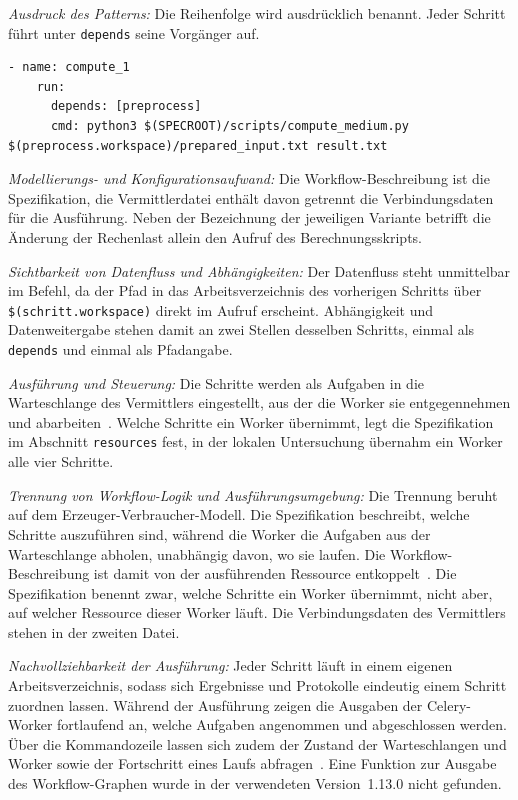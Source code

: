 \emph{Ausdruck des Patterns:} Die Reihenfolge wird ausdrücklich
benannt. Jeder Schritt führt unter \texttt{depends} seine Vorgänger
auf.

\begin{lstlisting}[caption={Abhängigkeit und Datenweitergabe eines Schritts (Merlin, Pipeline)},label={lst:pipe:me}]
  - name: compute_1
    run:
      depends: [preprocess]
      cmd: python3 $(SPECROOT)/scripts/compute_medium.py $(preprocess.workspace)/prepared_input.txt result.txt
\end{lstlisting}

\emph{Modellierungs- und Konfigurationsaufwand:} Die
Workflow-Beschreibung ist die Spezifikation, die Vermittlerdatei
enthält davon getrennt die Verbindungsdaten für die Ausführung. Neben der Bezeichnung der jeweiligen Variante betrifft die Änderung
der Rechenlast allein den Aufruf des Berechnungsskripts.

\emph{Sichtbarkeit von Datenfluss und Abhängigkeiten:} Der Datenfluss
steht unmittelbar im Befehl, da der Pfad in das Arbeitsverzeichnis
des vorherigen Schritts über \texttt{\$(schritt.workspace)} direkt im
Aufruf erscheint. Abhängigkeit und Datenweitergabe stehen damit an
zwei Stellen desselben Schritts, einmal als \texttt{depends} und
einmal als Pfadangabe.

\emph{Ausführung und Steuerung:} Die Schritte werden als Aufgaben in die Warteschlange des Vermittlers eingestellt, aus der die Worker
sie entgegennehmen und abarbeiten~\cite[S.~258]{peterson2022merlin}\cite{merlindocs-celery}. Welche Schritte ein
Worker übernimmt, legt die Spezifikation im Abschnitt
\texttt{resources} fest, in der lokalen Untersuchung übernahm ein
Worker alle vier Schritte.

\emph{Trennung von Workflow-Logik und Ausführungsumgebung:} Die
Trennung beruht auf dem Erzeuger-Verbraucher-Modell. Die
Spezifikation beschreibt, welche Schritte auszuführen sind, während
die Worker die Aufgaben aus der Warteschlange abholen, unabhängig
davon, wo sie laufen. Die Workflow-Beschreibung ist damit von der
ausführenden Ressource entkoppelt~\cite[S.~261]{peterson2022merlin}. Die
Spezifikation benennt zwar, welche Schritte ein Worker übernimmt,
nicht aber, auf welcher Ressource dieser Worker läuft. Die
Verbindungsdaten des Vermittlers stehen in der zweiten Datei.


\emph{Nachvollziehbarkeit der Ausführung:} Jeder Schritt läuft in
einem eigenen Arbeitsverzeichnis, sodass sich Ergebnisse und
Protokolle eindeutig einem Schritt zuordnen lassen. Während der
Ausführung zeigen die Ausgaben der Celery-Worker fortlaufend an,
welche Aufgaben angenommen und abgeschlossen werden. Über die
Kommandozeile lassen sich zudem der Zustand der Warteschlangen und
Worker sowie der Fortschritt eines Laufs abfragen~\cite{merlindocs-commands}.
Eine Funktion zur Ausgabe des Workflow-Graphen wurde in der
verwendeten Version~1.13.0 nicht gefunden.

